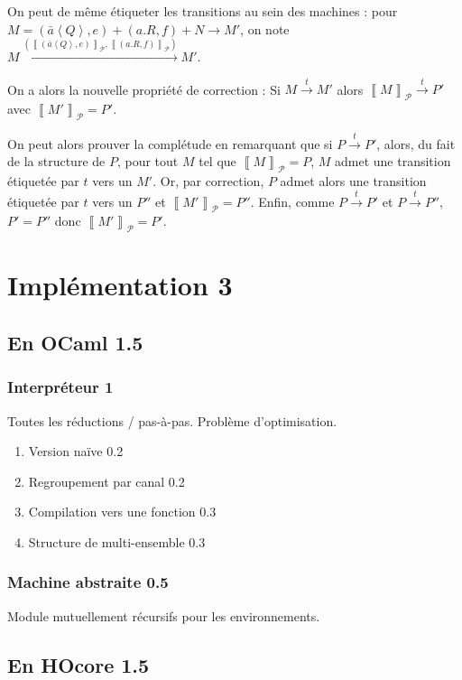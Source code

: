 \documentclass[11pt]{article}
\newcommand{\send}[2]{\bar{#1}\left\langle #2\right\rangle}
\newcommand{\paren}[1]{\left(#1\right)}
\newcommand{\process}[1]{\left\llbracket{#1}\right\rrbracket_{\mathcal{P}}}
\newcounter{c_theo}
\newcounter{c_def}
\begin{document}
\begin{enumerate}
On peut de même étiqueter les transitions au sein des machines : pour $M = (\send{a}Q, e) + (a.R, f) + N \to M'$, on note
$M \xrightarrow{\paren{ \process{(\send{a}Q, e)}, \process{(a.R,f)}} } M'$.

On a alors la nouvelle propriété de correction :
Si $M\xrightarrow{t} M'$ alors $\process{M}\xrightarrow{t} P'$ avec $\process{M'} = P'$.

On peut alors prouver la complétude en remarquant que si $P\xrightarrow{t}P'$, alors, du fait de la structure de $P$, pour tout $M$ tel que $\process{M} = P$, $M$ admet une transition étiquetée par $t$ vers un $M'$.
Or, par correction, $P$ admet alors une transition étiquetée par $t$ vers un $P''$ et $\process{M'} = P''$.
Enfin, comme $P\xrightarrow{t} P'$ et $P\xrightarrow{t} P''$, $P' = P''$ donc $\process{M'} = P'$.

\end{enumerate}


\section{Implémentation 3}
\label{sec-4}
\subsection{En OCaml 1.5}
\label{sec-4-1}
\subsubsection{Interpréteur 1}
\label{sec-4-1-1}
Toutes les réductions / pas-à-pas.
Problème d'optimisation.
\begin{enumerate}
\item Version naïve 0.2
\label{sec-4-1-1-1}
\item Regroupement par canal 0.2
\label{sec-4-1-1-2}
\item Compilation vers une fonction 0.3
\label{sec-4-1-1-3}
\item Structure de multi-ensemble 0.3
\label{sec-4-1-1-4}
\end{enumerate}
\subsubsection{Machine abstraite 0.5}
\label{sec-4-1-2}
Module mutuellement récursifs pour les environnements.
\subsection{En HOcore 1.5}
\label{sec-4-2}
\end{document}

